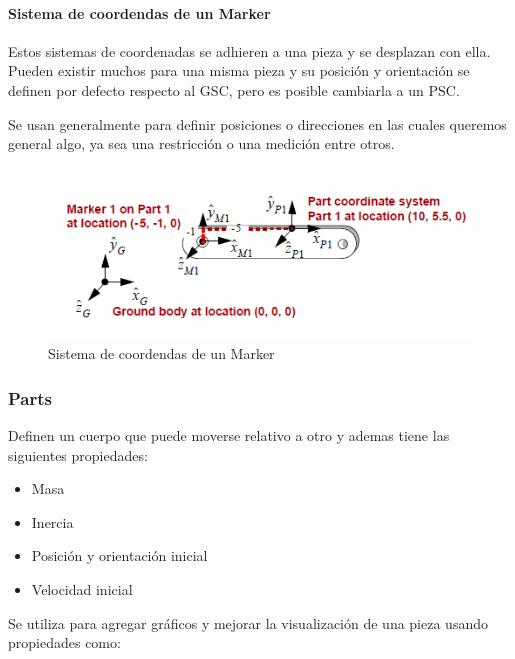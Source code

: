        \paragraph{Sistema de coordendas de un Marker}
        
        Estos sistemas de coordenadas se adhieren a una pieza y se desplazan con ella. Pueden existir muchos para una misma pieza y su posición y orientación se definen por defecto respecto al GSC, pero es posible cambiarla a un PSC.
        
        Se usan generalmente para definir posiciones o direcciones en las cuales queremos general algo, ya sea una restricción o una medición entre otros.
        
        \begin{figure}[H]
            \centering
           \includegraphics[width=0.8\linewidth]{Main/Chapter3/Images3/papeo/marker.png}
            \caption{Sistema de coordendas de un Marker\cite{adams-basic}}
            \label{f:Cap3-adams_marker}
        \end{figure} 
        
        \subsubsection{Parts}
        
        Definen un cuerpo que puede moverse relativo a otro y ademas tiene las siguientes propiedades:
        
        \begin{itemize}
            \item Masa
            \item Inercia
            \item Posición y orientación inicial
            \item Velocidad inicial
        \end{itemize}
        
        Se utiliza para agregar gráficos y mejorar la visualización de una pieza usando propiedades como:
        
